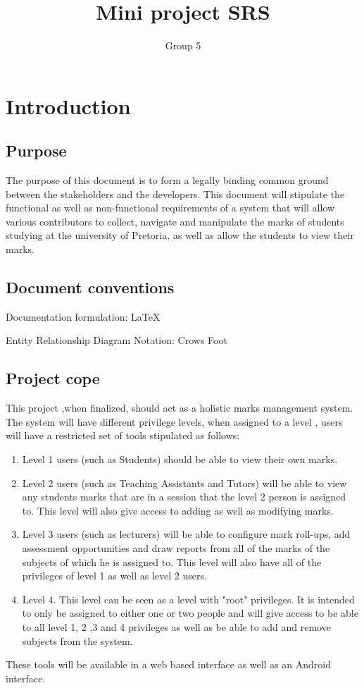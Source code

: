 \documentclass[10pt,a4paper]{article}
\author{Group 5}
\title{Mini project SRS}
\begin{document}
\tableofcontents
\pagebreak
\section{Introduction}

\subsection{Purpose}
The purpose of this document is to form a legally binding common ground between the stakeholders and the developers. This document will stipulate the functional as well as non-functional requirements of a system that will allow various contributors to collect, navigate and manipulate the marks of students studying at the university of Pretoria, as well as allow the students to view their marks.

\subsection{Document conventions}
\begin{description}
\item Documentation formulation: LaTeX
\item Entity Relationship Diagram Notation: Crows Foot 
\end{description}

\subsection{Project cope}
This project ,when finalized, should act as a holistic marks management system. The system will have different privilege levels, when assigned to a level , users will have a restricted set of tools stipulated as follows: 
\begin{enumerate}
\item Level 1 users (such as Students) should be able to view their own marks.
\item Level 2 users (such as Teaching Assistants and Tutors) will be able to view any students marks that are in a session that the level 2 person is assigned to. This level will also give access to adding as well as modifying marks.
\item Level 3 users (such as lecturers) will be able to configure mark roll-ups, add assessment opportunities and draw reports from all of the marks of the subjects of which he is assigned to. This level will also have all of the privileges of level 1 as well as level 2 users.
\item Level 4. This level can be seen as a level with "root" privileges. It is intended to only be assigned to either one or two people and will give access to be able to all level 1, 2 ,3 and 4 privileges as well as be able to add and remove subjects from the system. 
\end{enumerate}
These tools will be available in a web based interface as well as an Android interface.
\end{document}
